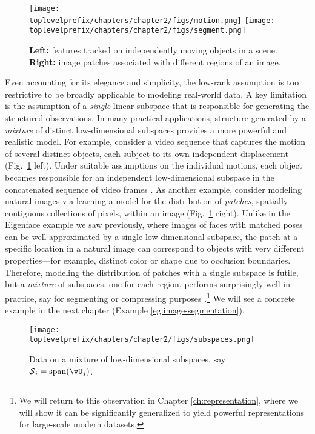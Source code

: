 \documentclass[\toplevelprefix/book-main.tex]{subfiles}
\begin{document}
\begin{figure}
    \centering
    \texttt{[image: \\toplevelprefix/chapters/chapter2/figs/motion.png]} \hspace{5mm}
    \texttt{[image: \\toplevelprefix/chapters/chapter2/figs/segment.png]} 
    \caption{\textbf{Left:} features tracked on independently moving objects in a scene. \textbf{Right:} image patches associated with different regions of an image.}
    \label{fig:multiple-subspaces}
\end{figure}
Even accounting for its elegance and simplicity, the low-rank assumption is too restrictive to be broadly applicable to modeling real-world data. 
A key limitation is the assumption of a \textit{single} linear subspace that is responsible for generating the structured observations.
In many practical applications, structure generated by a \textit{mixture} of distinct low-dimensional subspaces provides a more
powerful and realistic model.
For example, consider a video sequence that captures the motion of several distinct objects, each subject to its own independent displacement (Fig.\ \ref{fig:multiple-subspaces} left). 
Under suitable assumptions on the individual motions, each object becomes responsible for an independent low-dimensional subspace in the concatenated sequence of video frames \cite{VidalR2004-ECCV}.
As another example, consider modeling natural images via learning a model for the distribution of \textit{patches}, spatially-contiguous collections of pixels, within an image (Fig.\ \ref{fig:multiple-subspaces} right). Unlike in the Eigenface example we saw previously, where images of faces with matched poses can be well-approximated by a single low-dimensional subspace, the patch at a specific location in a natural image can correspond to objects with very different properties---for example, distinct color or shape due to occlusion boundaries. Therefore, modeling the distribution of patches with a single subspace is futile, but a \textit{mixture} of subspaces, one for each region, performs surprisingly well in practice, say for segmenting or compressing purposes \cite{Mobahi-IJCV2011}.\footnote{We will return to this observation in Chapter \ref{ch:representation}, where we will show it can be significantly generalized to yield powerful representations for large-scale modern datasets.} We will see a concrete example in the next chapter (Example \ref{eg:image-segmentation}).



\begin{figure}
    \centering
    \texttt{[image: \\toplevelprefix/chapters/chapter2/figs/subspaces.png]}
    \caption{Data on a mixture of low-dimensional subspaces, say $\mathcal{S}_j = \mbox{span}(\vU_j)$.}
    \label{fig:subspaces}
\end{figure}
\end{document}

